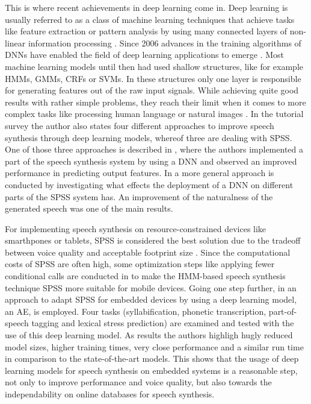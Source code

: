 This is where recent achievements in deep learning come in. Deep learning is usually referred to as a class of machine learning techniques that achieve tasks like feature extraction or pattern analysis by using many connected layers of non-linear information processing \cite{ling:deep, li:survey}. Since 2006 advances in the training algorithms of \acp{DNN} have enabled the field of deep learning applications to emerge \cite{boros:robust}. Most machine learning models until then had used shallow structures, like for example \acp{HMM}, \acp{GMM}, \acp{CRF} or \acp{SVM}. In these structures only one layer is responsible for generating features out of the raw input signals. While achieving quite good results with rather simple problems, they reach their limit when it comes to more complex tasks like processing human language or natural images \cite{li:survey}. In the tutorial survey \cite{li:survey} the author also states four different approaches to improve speech synthesis through deep learning models, whereof three are dealing with \ac{SPSS}. One of those three approaches is described in \cite{zen:deepstatistical}, where the authors implemented a part of the speech synthesis system by using a \ac{DNN} and observed an improved performance in predicting output features. In \cite{hashimoto:effect} a more general approach is conducted by investigating what effects the deployment of a \ac{DNN} on different parts of the \ac{SPSS} system has. An improvement of the naturalness of the generated speech was one of the main results.

For implementing speech synthesis on resource-constrained devices like smarthpones or tablets, \ac{SPSS} is considered the best solution due to the tradeoff between voice quality and acceptable footprint size \cite{toth:optimizing}. Since the computational costs of \ac{SPSS} are often high, some optimization steps like applying fewer conditional calls are conducted in \cite{toth:optimizing} to make the \ac{HMM}-based speech synthesis technique \ac{SPSS} more suitable for mobile devices. Going one step further, in \cite{boros:robust} an approach to adapt \ac{SPSS} for embedded devices by using a deep learning model, an \ac{AE}, is employed. Four tasks (syllabification, phonetic transcription, part-of-speech tagging and lexical stress prediction) are examined and tested with the use of this deep learning model. As results the authors highligh hugly reduced model sizes, higher training times, very close performance and a similar run time in comparison to the state-of-the-art models. This shows that the usage of deep learning models for speech synthesis on embedded systems is a reasonable step, not only to improve performance and voice quality, but also towards the independability on online databases for speech synthesis.

